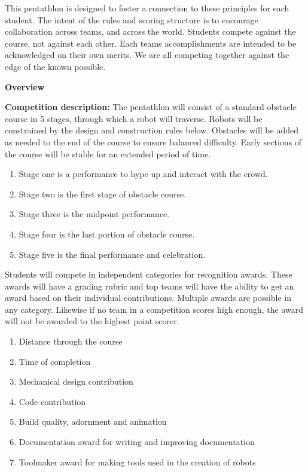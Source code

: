\documentclass{article}
\begin{document}
  
This pentathlon is designed to foster a connection to these principles for each student. The intent of the rules and scoring structure is to encourage collaboration across teams, and across the world. Students compete against the course, not against each other. Each teams accomplishments are intended to be acknowledged on their own merits. We are all competing together against the edge of the known possible.
\pagebreak



{\huge \textbf{Overview}}
\vspace{1cm}

\textbf{Competition description:} The pentathlon will consist of a standard obstacle course in 5 stages, through which a robot will traverse. Robots will be constrained by the design and construction rules below. Obstacles will be added as needed to the end of the course to ensure balanced difficulty. Early sections of the course will be stable for an extended period of time. 
\begin{enumerate}
\item Stage one is a performance to hype up and interact with the crowd.

\item Stage two is the first stage of obstacle course. 

\item Stage three is the midpoint performance.

\item Stage four is the last portion of obstacle course. 

\item Stage five is the final performance and celebration. 
\end{enumerate}

Students will compete in independent categories for recognition awards. These awards will have a grading rubric and top teams will have the ability to get an award based on their individual contributions. Multiple awards are possible in any category. Likewise if no team in a competition scores high enough, the award will not be awarded to the highest point scorer. 

\begin{enumerate}
	
\item Distance through the course
 
\item Time of completion
 
\item Mechanical design contribution
 
\item Code contribution
 
 \item Build quality, adornment and animation
 
 \item Documentation award for writing and improving documentation
 
 \item Toolmaker award for making tools used in the creation of robots
 
\end{enumerate}
\end{document}
